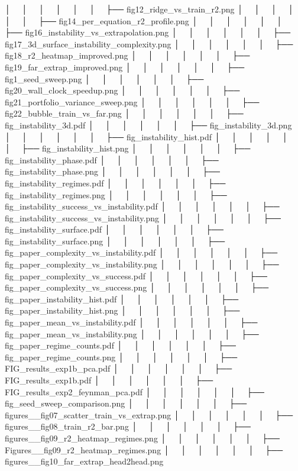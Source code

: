 │   │       │   │   │   │   ├── fig12_ridge_vs_train_r2.png
│   │       │   │   │   │   ├── fig14_per_equation_r2_profile.png
│   │       │   │   │   │   ├── fig16_instability_vs_extrapolation.png
│   │       │   │   │   │   ├── fig17_3d_surface_instability_complexity.png
│   │       │   │   │   │   ├── fig18_r2_heatmap_improved.png
│   │       │   │   │   │   ├── fig19_far_extrap_improved.png
│   │       │   │   │   │   ├── fig1_seed_sweep.png
│   │       │   │   │   │   ├── fig20_wall_clock_speedup.png
│   │       │   │   │   │   ├── fig21_portfolio_variance_sweep.png
│   │       │   │   │   │   ├── fig22_bubble_train_vs_far.png
│   │       │   │   │   │   ├── fig_instability_3d.pdf
│   │       │   │   │   │   ├── fig_instability_3d.png
│   │       │   │   │   │   ├── fig_instability_hist.pdf
│   │       │   │   │   │   ├── fig_instability_hist.png
│   │       │   │   │   │   ├── fig_instability_phase.pdf
│   │       │   │   │   │   ├── fig_instability_phase.png
│   │       │   │   │   │   ├── fig_instability_regimes.pdf
│   │       │   │   │   │   ├── fig_instability_regimes.png
│   │       │   │   │   │   ├── fig_instability_success_vs_instability.pdf
│   │       │   │   │   │   ├── fig_instability_success_vs_instability.png
│   │       │   │   │   │   ├── fig_instability_surface.pdf
│   │       │   │   │   │   ├── fig_instability_surface.png
│   │       │   │   │   │   ├── fig_paper_complexity_vs_instability.pdf
│   │       │   │   │   │   ├── fig_paper_complexity_vs_instability.png
│   │       │   │   │   │   ├── fig_paper_complexity_vs_success.pdf
│   │       │   │   │   │   ├── fig_paper_complexity_vs_success.png
│   │       │   │   │   │   ├── fig_paper_instability_hist.pdf
│   │       │   │   │   │   ├── fig_paper_instability_hist.png
│   │       │   │   │   │   ├── fig_paper_mean_vs_instability.pdf
│   │       │   │   │   │   ├── fig_paper_mean_vs_instability.png
│   │       │   │   │   │   ├── fig_paper_regime_counts.pdf
│   │       │   │   │   │   ├── fig_paper_regime_counts.png
│   │       │   │   │   │   ├── FIG_results_exp1b_pca.pdf
│   │       │   │   │   │   ├── FIG_results_exp1b.pdf
│   │       │   │   │   │   ├── FIG_results_exp2_feynman_pca.pdf
│   │       │   │   │   │   ├── fig_seed_sweep_comparison.png
│   │       │   │   │   │   ├── figures__fig07_scatter_train_vs_extrap.png
│   │       │   │   │   │   ├── figures__fig08_train_r2_bar.png
│   │       │   │   │   │   ├── figures__fig09_r2_heatmap_regimes.png
│   │       │   │   │   │   ├── Figures__fig09_r2_heatmap_regimes.png
│   │       │   │   │   │   ├── figures__fig10_far_extrap_head2head.png
